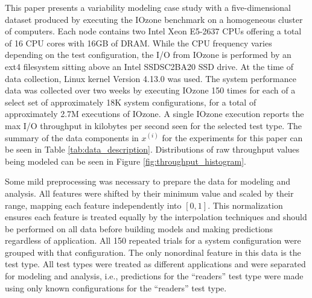 \documentclass[letterpaper, 10 pt, conference]{ieeeconf}  %
\begin{document}
This paper presents a variability modeling case study with a five-dimensional dataset produced by executing the IOzone benchmark \cite{iozone} on a homogeneous cluster of computers. Each node contains two Intel Xeon E5-2637 CPUs offering a total of 16 CPU cores with 16GB of DRAM. While the CPU frequency varies depending on the test configuration, the I/O from IOzone is performed by an ext4 filesystem sitting above an Intel SSDSC2BA20 SSD drive. At the time of data collection, Linux kernel Version 4.13.0 was used. The system performance data was collected over two weeks by executing IOzone 150 times for each of a select set of approximately 18K system configurations, for a total of approximately 2.7M executions of IOzone. A single IOzone execution reports the max I/O throughput in kilobytes per second seen for the selected test type. The summary of the data components in $x^{(i)}$ for the experiments for this paper can be seen in Table \ref{tab:data_description}. Distributions of raw throughput values being modeled can be seen in Figure \ref{fig:throughput_histogram}.

Some mild preprocessing was necessary to prepare the data for modeling and analysis. All features were shifted by their minimum value and scaled by their range, mapping each feature independently into $[0,1]$. This normalization ensures each feature is treated equally by the interpolation techniques and should be performed on all data before building models and making predictions regardless of application. All 150 repeated trials for a system configuration were grouped with that configuration. The only nonordinal feature in this data is the test type. All test types were treated as different applications and were separated for modeling and analysis, i.e., predictions for the ``readers'' test type were made using only known configurations for the ``readers'' test type.

\end{document}
